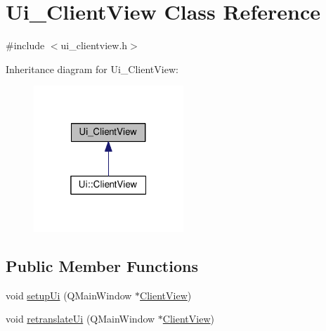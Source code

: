 \hypertarget{class_ui___client_view}{}\section{Ui\+\_\+\+Client\+View Class Reference}
\label{class_ui___client_view}


{\ttfamily \#include $<$ui\+\_\+clientview.\+h$>$}



Inheritance diagram for Ui\+\_\+\+Client\+View\+:
\nopagebreak
\begin{figure}[H]
\begin{center}
\leavevmode
\includegraphics[width=160pt]{class_ui___client_view__inherit__graph}
\end{center}
\end{figure}
\subsection*{Public Member Functions}
\begin{DoxyCompactItemize}
\item 
void \hyperlink{class_ui___client_view_adff119c9cb5075faa8716d48a69a328c}{setup\+Ui} (Q\+Main\+Window $\ast$\hyperlink{class_client_view}{Client\+View})
\item 
void \hyperlink{class_ui___client_view_ad40444a90323dec758fdb132098f59be}{retranslate\+Ui} (Q\+Main\+Window $\ast$\hyperlink{class_client_view}{Client\+View})
\end{DoxyCompactItemize}

